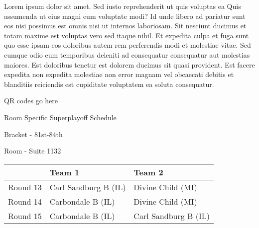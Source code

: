 \documentclass{article}%
\begin{document}
\vspace*{8pt}%
\newline%
Lorem ipsum dolor sit amet. Sed iusto reprehenderit ut quis voluptas ea Quis assumenda ut eius magni eum voluptate modi? Id unde libero ad pariatur sunt eos nisi possimus est omnis nisi ut internos laboriosam. Sit nesciunt ducimus et totam maxime est voluptas vero sed itaque nihil. Et expedita culpa et fuga sunt quo esse ipsam eos doloribus autem rem perferendis modi et molestiae vitae.\newline%
\newline%
Sed cumque odio eum temporibus deleniti ad consequatur consequatur aut molestias maiores. Est doloribus tenetur est dolorem ducimus sit quasi provident. Est facere expedita non expedita molestiae non error magnam vel obcaecati debitis et blanditiis reiciendis est cupiditate voluptatem ea soluta consequatur.%
\vspace*{140pt}%
\begin{center}%
\begin{Huge}%
QR codes go here%
\end{Huge}%
\end{center}%
\newpage%
\begin{center}%
\begin{Huge}%
Room Specific Superplayoff Schedule%
\end{Huge}%
\vspace*{8pt}%
\linebreak%
\begin{Large}%
Bracket {-} 81st{-}84th%
\end{Large}%
\vspace*{8pt}%
\linebreak%
\vspace*{8pt}%
\begin{Large}%
Room {-} Suite 1132%
\end{Large}%
\end{center}%
%
\begin{tabularx}{\textwidth}{|c|Y|Y|}%
\hline%
&Team 1&Team 2\\%
\hline%
Round 13&Carl Sandburg B (IL)&Divine Child (MI)\\%
Round 14&Carbondale B (IL)&Divine Child (MI)\\%
Round 15&Carbondale B (IL)&Carl Sandburg B (IL)\\%
\hline%
\end{tabularx}%
\vspace*{8pt}%
\newline%
\end{document}
